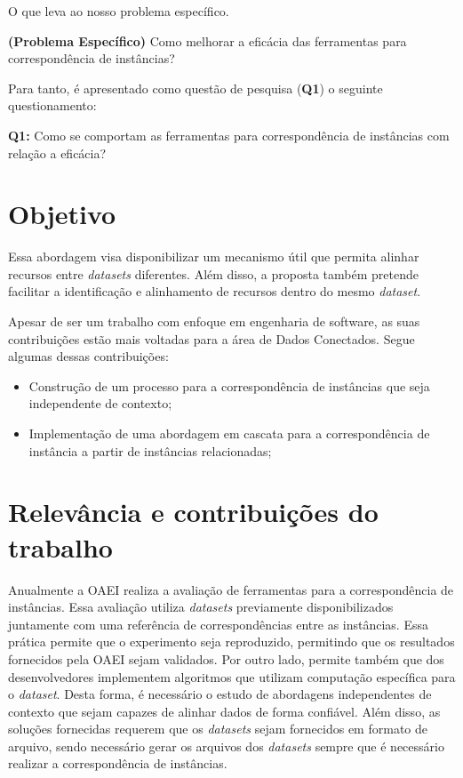 O que leva ao nosso problema específico.

\textbf{(Problema Específico)} Como melhorar a eficácia das ferramentas para correspondência de instâncias?

Para tanto, é apresentado como questão de pesquisa (\textbf{Q1}) o seguinte questionamento:

\textbf{Q1:} Como se comportam as ferramentas para correspondência de instâncias com relação a eficácia?

\section{Objetivo}


Essa abordagem visa disponibilizar um mecanismo útil que permita alinhar recursos entre \textit{datasets} diferentes. Além disso, a proposta também pretende facilitar a identificação e alinhamento de recursos dentro do mesmo \textit{dataset}. 

Apesar de ser um trabalho com enfoque em engenharia de software, as suas contribuições estão mais voltadas para a área de Dados Conectados. Segue algumas dessas contribuições:

\begin{itemize}
        \item Construção de um processo para a correspondência de instâncias que seja independente de contexto;
        \item Implementação de uma abordagem em cascata para a correspondência de instância a partir de instâncias relacionadas;
\end{itemize}


\section{Relevância e contribuições do trabalho}
\label{contribuicao}
Anualmente a OAEI realiza a avaliação de ferramentas para a correspondência de instâncias. Essa avaliação utiliza \textit{datasets} previamente disponibilizados juntamente com uma referência de correspondências entre as instâncias. Essa prática permite que o experimento seja reproduzido, permitindo que os resultados fornecidos pela OAEI sejam validados. Por outro lado, permite também que dos desenvolvedores implementem algoritmos que utilizam computação específica para o \textit{dataset}. Desta forma, é necessário o estudo de abordagens independentes de contexto que sejam capazes de alinhar dados de forma confiável. Além disso, as soluções fornecidas requerem que os \textit{datasets} sejam fornecidos em formato de arquivo, sendo necessário gerar os arquivos dos \textit{datasets} sempre que é necessário realizar a correspondência de instâncias.

